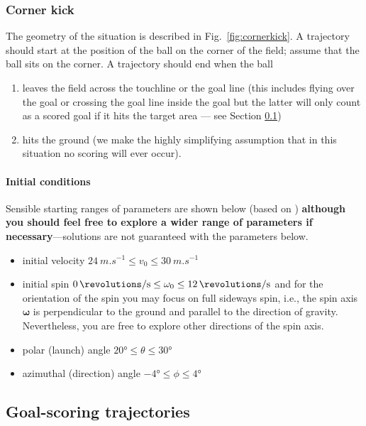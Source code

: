\documentclass[letterpaper]{scrartcl}
\begin{document}
\subsubsection{Corner kick}
\label{sec:cornerkick}

The geometry of the situation is described in
Fig.~\ref{fig:cornerkick}. A trajectory should start at the position
of the ball on the corner of the field; assume that the ball sits on
the corner. A trajectory should end when the ball
\begin{enumerate}
\item leaves the field across the touchline or the goal line (this
  includes flying over the goal or crossing the goal line inside the
  goal but the latter will only count as a scored goal if it hits the
  target area --- see Section \ref{sec:scoring})
\item hits the ground (we make the highly simplifying assumption that
  in this situation no scoring will ever occur).
\end{enumerate}

\paragraph{Initial conditions}

Sensible starting ranges of parameters are shown below (based on
\citet{Cook:2006aa}) \textbf{although you should feel free to explore
  a wider range of parameters if necessary}---solutions are not
guaranteed with the parameters below.
\begin{itemize}
\item initial velocity $\SI{24}{m.s^{-1}} \le v_{0} \le
  \SI{30}{m.s^{-1}}$
\item initial spin
  $\SI{0}{\revolutions\per\second} \le \omega_{0} \le
  \SI{12}{\revolutions\per\second}$ and for the orientation of the
  spin you may focus on full sideways spin, i.e., the spin axis
  $\boldsymbol{\omega}$ is perpendicular to the ground and parallel to
  the direction of gravity. Nevertheless, you are free to explore
  other directions of the spin axis.
\item polar (launch) angle $\ang{20} \le \theta \le \ang{30}$
\item azimuthal (direction) angle $\ang{-4} \le \phi \le \ang{4}$
\end{itemize}


\subsection{Goal-scoring trajectories}
\label{sec:scoring}
\end{document}
